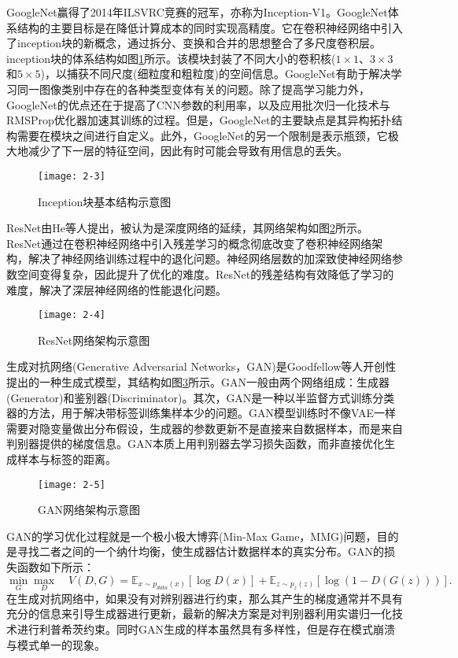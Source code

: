 GoogleNet赢得了2014年ILSVRC竞赛的冠军，亦称为Inception-V1。GoogleNet体系结构的主要目标是在降低计算成本的同时实现高精度。它在卷积神经网络中引入了inception块的新概念，通过拆分、变换和合并的思想整合了多尺度卷积层。inception块的体系结构如图\ref{fig:2-3}所示。该模块封装了不同大小的卷积核($1\times1$、$3\times3$和$5\times5$)，以捕获不同尺度(细粒度和粗粒度)的空间信息。GoogleNet有助于解决学习同一图像类别中存在的各种类型变体有关的问题。除了提高学习能力外，GoogleNet的优点还在于提高了CNN参数的利用率，以及应用批次归一化技术与RMSProp优化器加速其训练的过程。但是，GoogleNet的主要缺点是其异构拓扑结构需要在模块之间进行自定义。此外，GoogleNet的另一个限制是表示瓶颈，它极大地减少了下一层的特征空间，因此有时可能会导致有用信息的丢失。
\begin{figure}[!hptb]
	\centering
	\texttt{[image: 2-3]}
	\caption{Inception块基本结构示意图}\label{fig:2-3}
\end{figure}

ResNet由He等人提出，被认为是深度网络的延续，其网络架构如图\ref{fig:2-4}所示。ResNet通过在卷积神经网络中引入残差学习的概念彻底改变了卷积神经网络架构，解决了神经网络训练过程中的退化问题。神经网络层数的加深致使神经网络参数空间变得复杂，因此提升了优化的难度。ResNet的残差结构有效降低了学习的难度，解决了深层神经网络的性能退化问题。
\begin{figure}[!hptb]
	\centering
	\texttt{[image: 2-4]}
	\caption{ResNet网络架构示意图}\label{fig:2-4}
\end{figure}

生成对抗网络(Generative Adversarial Networks，GAN)是Goodfellow等人开创性提出的一种生成式模型，其结构如图\ref{fig:2-5}所示。GAN一般由两个网络组成：生成器(Generator)和鉴别器(Discriminator)。其次，GAN是一种以半监督方式训练分类器的方法，用于解决带标签训练集样本少的问题。GAN模型训练时不像VAE一样需要对隐变量做出分布假设，生成器的参数更新不是直接来自数据样本，而是来自判别器提供的梯度信息。GAN本质上用判别器去学习损失函数，而非直接优化生成样本与标签的距离。
\begin{figure}[!htbp]
	\centering
	\texttt{[image: 2-5]}
	\caption{GAN网络架构示意图}\label{fig:2-5}
\end{figure}

GAN的学习优化过程就是一个极小极大博弈(Min-Max Game，MMG)问题，目的是寻找二者之间的一个纳什均衡，使生成器估计数据样本的真实分布。GAN的损失函数如下所示：
\begin{equation} \label{second:GAN}
	\min_{G}\max_{D}\quad V(D,G)=\mathbb{E}_{x\sim{p_{data}(x)}}[\log{D(x)}]+\mathbb{E}_{z\sim{p_{z}(z)}}[\log{(1-D(G(z)))}].
\end{equation}
在生成对抗网络中，如果没有对辨别器进行约束，那么其产生的梯度通常并不具有充分的信息来引导生成器进行更新，最新的解决方案是对判别器利用实谱归一化技术进行利普希茨约束。同时GAN生成的样本虽然具有多样性，但是存在模式崩溃与模式单一的现象。

